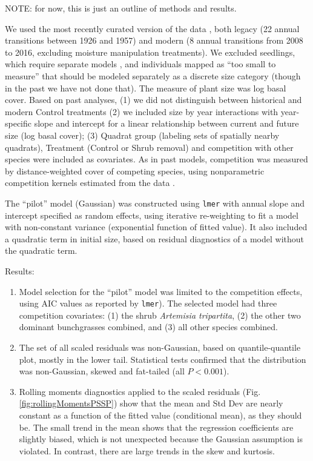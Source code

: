 \documentclass[11pt]{article}
\begin{document}
{NOTE: for now, this is just an outline of methods and results. 

We used the most recently curated version of the data \citep[][at doi.org/10.5061/dryad.96dn293]{Adler-2018},
both legacy (22 annual transitions between 1926 and 1957) and modern (8 annual transitions from
2008 to 2016, excluding moisture manipulation treatments). We excluded seedlings, which require separate models
\citep{Chu-2014a, Chu-2015, snyder-ellner-2018}, and individuals mapped as ``too small to measure'' that should be modeled separately
as a discrete size category (though in the past we have not done that). The measure of plant size was log basal cover. 
Based on past analyses, (1) we did not distinguish between historical and 
modern Control treatments \citep{Adler-2018} (2) we included size by year interactions with year-specific slope and intercept
for a linear relationship between current and future size (log basal cover); (3) Quadrat group (labeling sets of spatially
nearby quadrats), Treatment (Control or Shrub removal) and competition with other species were included as covariates. 
As in past models, competition was measured by distance-weighted cover of competing species, using nonparametric competition
kernels estimated from the data \citep{Teller-2016}. 

The ``pilot'' model (Gaussian) was constructed using \texttt{lmer} with annual slope and intercept specified 
as random effects, using iterative re-weighting to fit a model with non-constant variance (exponential function of fitted value). 
It also included a quadratic term in initial size, based on residual diagnostics of a model without the quadratic term. 

Results: \begin{enumerate}

\item Model selection for the ``pilot'' model was limited to the competition effects,  
using AIC values as reported by \texttt{lmer}). The selected model had  
three competition covariates: (1) the shrub \emph{Artemisia tripartita}, (2) the other two dominant 
bunchgrasses combined, and (3) all other species combined. 

\item The set of all scaled residuals was non-Gaussian, based on quantile-quantile plot, mostly in the lower tail. Statistical tests
confirmed that the distribution was non-Gaussian, skewed and fat-tailed (all $P<0.001$). 

\item Rolling moments diagnostics applied to the scaled residuals (Fig. \ref{fig:rollingMomentsPSSP}) show that the mean 
and Std Dev are nearly constant as a function of the fitted value (conditional mean), as they should be. The small trend in 
the mean shows that the regression coefficients are slightly biased, which is not unexpected because the Gaussian assumption is violated. 
In contrast, there are large trends in the skew and kurtosis. 


\end{enumerate}}
\end{document}
